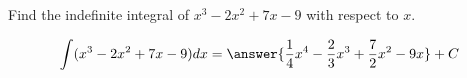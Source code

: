 \documentclass{ximera}
\author{Gregory Hartman \and Matthew Carr\and Nela Lakos}
\begin{document}
\begin{exercise}

Find the indefinite integral of $x^3-2x^2+7x-9$ with respect to $x$.
\begin{prompt}
  \[
  \int (x^3-2x^2+7x-9) dx =\answer{\frac{1}{4}x^4-\frac{2}{3}x^3+\frac{7}{2}x^2-9x}+C
  \]
\end{prompt}

\end{exercise}
\end{document}
